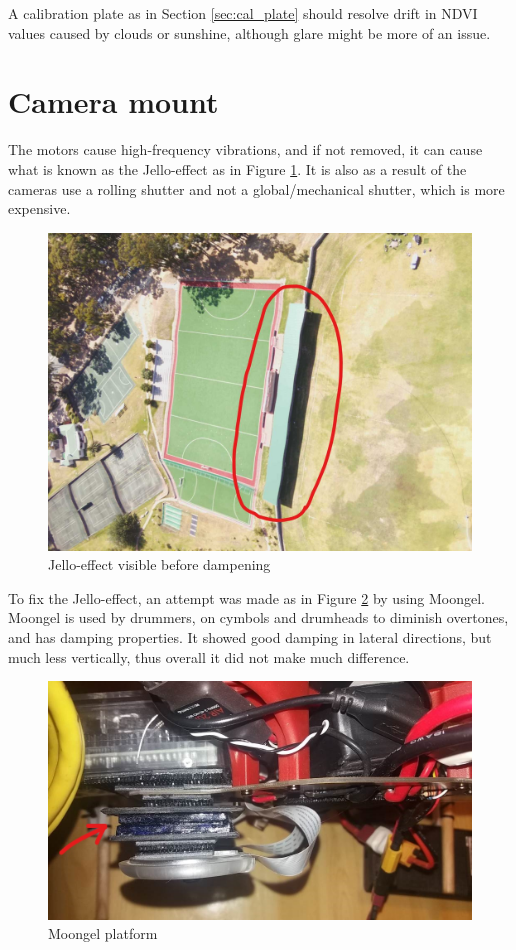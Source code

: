 A calibration plate as in Section \ref{sec:cal_plate} should resolve drift in NDVI values caused by clouds or sunshine, although glare might be more of an issue.

\section{Camera mount}

The motors cause high-frequency vibrations, and if not removed, it can cause what is known as the Jello-effect as in Figure \ref{fig:jello_effect}. It is also as a result of the cameras use a rolling shutter and not a global/mechanical shutter, which is more expensive.

\begin{figure}[H]
\centering
\includegraphics[scale=0.27]{images/ripple.jpg}
\caption{Jello-effect visible before dampening}
\label{fig:jello_effect}
\end{figure}

To fix the Jello-effect, an attempt was made as in Figure \ref{fig:moon_gel} by using Moongel. Moongel is used by drummers, on cymbols and drumheads to diminish overtones, and has damping properties. It showed good damping in lateral directions, but much less vertically, thus overall it did not make much difference.

\begin{figure}[H]
\centering
\includegraphics[scale=0.27]{images/moon_gel.jpg}
\caption{Moongel platform}
\label{fig:moon_gel}
\end{figure}

